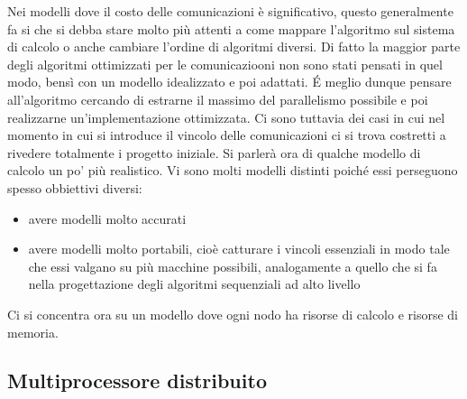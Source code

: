 \documentclass[a4paper,portrait,12pt]{article}
\theoremstyle{definition}
\begin{document}
Nei modelli dove il costo delle comunicazioni è significativo, questo generalmente fa si che si debba stare molto più attenti a come mappare l’algoritmo sul sistema di calcolo o anche cambiare l’ordine di
algoritmi diversi.
Di fatto la maggior parte degli algoritmi ottimizzati per le comunicaziooni non sono stati pensati in quel modo, bensì con un modello idealizzato e poi adattati.
\'E meglio dunque pensare all’algoritmo cercando di estrarne il massimo del parallelismo possibile e poi realizzarne un'implementazione ottimizzata.
Ci sono tuttavia dei casi in cui nel momento in cui si introduce il vincolo delle comunicazioni ci si trova costretti a rivedere totalmente i progetto iniziale.
Si parlerà ora di qualche modello di calcolo un po’ più realistico.
Vi sono molti modelli distinti poiché essi perseguono spesso obbiettivi diversi:
\begin{itemize}
\item avere modelli molto accurati
\item avere modelli molto portabili, cioè catturare i vincoli essenziali in modo tale che essi valgano su più macchine possibili, analogamente a quello che si fa nella progettazione degli algoritmi sequenziali ad alto livello
\end{itemize}
Ci si concentra ora su un modello dove ogni nodo ha risorse di calcolo e risorse di memoria.

\subsection{Multiprocessore distribuito}
\end{document}
